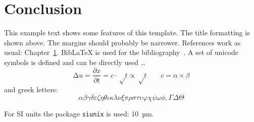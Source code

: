 \chapter{Conclusion}
\label{cha:conclusion}

This example text shows some features of this template.
The title formatting is shown above. The margins should probably be narrower.
References work as usual: Chapter~\ref{cha:conclusion}.
Bib\LaTeX{} is used for the bibliography~\cite{PAS-LUM-13-001,higgscms2012}.
A set of unicode symbols is defined and can be directly used …
\[
	∆u = \frac{∂x}{∂t} = c · √t ∝ √t \qquad c = α × β
\]
and greek letters:
\[
	αβγδεζηθικλ νξπρστυφχψωϕ, ΓΔΘ
\]

For SI units the package \texttt{siunix} is used: \SI{10}{µm}.

